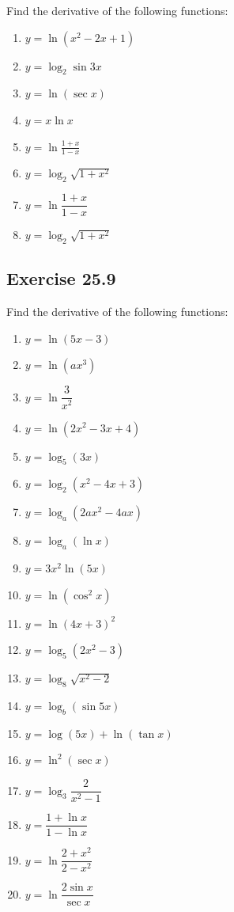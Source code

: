 \documentclass[12pt]{report}
\begin{document}
Find the derivative of the following functions: \setlength{\columnseprule}{1pt}
\setlength{\columnsep}{24pt}
\begin{multicols}{2}
  \begin{enumerate}
    \item $y=\ln\left(x^{2}-2x+1\right)$
    \item $y=\log_{2}\sin3x$
    \item $y=\ln(\sec x)$
    \item $y=x\ln x$
    \item $y=\ln{\frac{1+x}{1-x}}$
    \item $y=\log_{2}{\sqrt{1+x^{2}}}$
    \item $y=\ln{\dfrac{1+x}{1-x}}$
    \item $y=\log_{2}{\sqrt{1+x^{2}}}$
  \end{enumerate}
\end{multicols}

\subsection{Exercise 25.9}

Find the derivative of the following functions: \setlength{\columnseprule}{1pt}
\setlength{\columnsep}{24pt}
\begin{multicols}{2}
  \begin{enumerate}
    \item $y=\ln\left(5x-3\right)$
    \item $y=\ln\left(a x^{3}\right)$
    \item $y=\ln{\dfrac{3}{x^{2}}}$
    \item $y=\ln\left(2x^{2}-3x+4\right)$
    \item $y=\log_{5}(3x)$
    \item $y=\log_{2}\left(x^{2}-4x\!+\!3\right)$
    \item $y=\log_{a}\left(2a x^{2}-4a x\right)$
    \item $y=\log_{a}\left(\ln x\right)$
    \item $y=3x^{2}\ln\left(5x\right)$
    \item $y=\ln\left(\cos^{2}x\right)$
    \item $y=\ln{(4x+3)}^{2}$
    \item $y=\log_{5}\left(2x^{2}-3\right)$
    \item $y=\log_{8}{\sqrt{x^{2}-2}}$
    \item $y=\log_{b}(\sin5x)$
    \item $y=\log{(5x)}+\ln{(\tan{x})}$
    \item $y=\ln^{2}(\sec x)$
    \item $y=\log_{3}{\dfrac{2}{x^{2}-1}}$
    \item $y={\dfrac{1+\ln x}{1-\ln x}}$
    \item $y=\ln{\dfrac{2+x^{2}}{2-x^{2}}}$
    \item $y=\ln{\dfrac{2\sin x}{\sec x}}$
  \end{enumerate}
\end{multicols}
\end{document}
